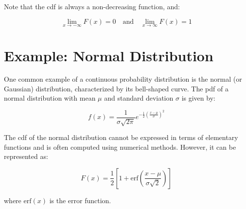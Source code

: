 Note that the cdf is always a non-decreasing function, and:

\begin{equation}
\lim_{x\to-\infty} F(x) = 0 \quad \text{and} \quad \lim_{x\to\infty} F(x) = 1
\end{equation}

\section{Example: Normal Distribution}

One common example of a continuous probability distribution is the
normal (or Gaussian) distribution, characterized by its bell-shaped
curve. The pdf of a normal distribution with mean $\mu$ and standard
deviation $\sigma$ is given by:

\begin{equation}
f(x) = \frac{1}{\sigma\sqrt{2\pi}} e^{ -\frac{1}{2} \left(\frac{x-\mu}{\sigma}\right)^2 }
\end{equation}

The cdf of the normal distribution cannot be expressed in terms of
elementary functions and is often computed using numerical
methods. However, it can be represented as:

\begin{equation}
F(x) = \frac{1}{2}[1 + \text{erf}(\frac{x - \mu}{\sigma\sqrt{2}})]
\end{equation}

where $\text{erf}(x)$ is the error function.

